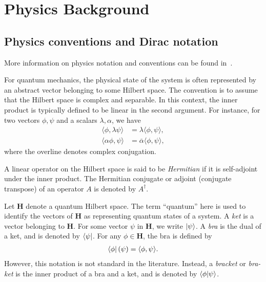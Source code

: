 \chapter{Physics Background}\label{ch:physics_background}

\section{Physics conventions and Dirac notation}\label{sec:basics}

More information on physics notation and conventions can be found in~\cite{Hall2013,Griffiths2018,Tung1985,Zwiebach2022}.

For quantum mechanics, the physical state of the system is often represented by an abstract vector belonging to some Hilbert space. The convention is to assume that the Hilbert space is complex and separable. In this context, the inner product is typically defined to be linear in the second argument. For instance, for two vectors $\phi,\psi$ and a scalars $\lambda,\alpha$, we have
\begin{align}
    \langle \phi,\lambda\psi\rangle&=\lambda\langle \phi,\psi\rangle, \\
    \langle \alpha\phi,\psi\rangle&=\overline{\alpha}\langle \phi,\psi\rangle,
\end{align}
where the overline denotes complex conjugation.

A linear operator on the Hilbert space is said to be \textit{Hermitian} if it is self-adjoint under the inner product. The Hermitian conjugate or adjoint (conjugate transpose) of an operator $A$ is denoted by $A^\dagger$.

Let $\mathbf{H}$ denote a quantum Hilbert space. The term ``quantum'' here is used to identify the vectors of $\mathbf{H}$ as representing quantum states of a system. A \textit{ket} is a vector belonging to $\mathbf{H}$. For some vector $\psi$ in $\mathbf{H}$, we write $\ket{\psi}$. A \textit{bra} is the dual of a ket, and is denoted by $\bra{\psi}$. For any $\phi\in \mathbf{H}$, the bra is defined by
\begin{align}
    \bra{\phi}(\psi) = \langle \phi,\psi\rangle.
\end{align}
However, this notation is not standard in the literature. Instead, a \textit{bracket} or \textit{bra-ket} is the inner product of a bra and a ket, and is denoted by $\braket{\phi|\psi}$.

